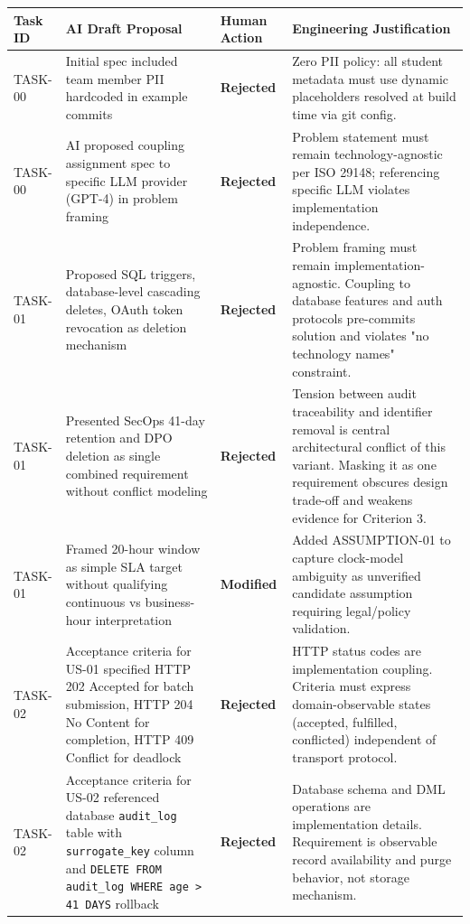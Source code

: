 \documentclass[10pt,a4paper]{article}
\begin{document}
\begin{table}[h]
\centering
\tiny
\begin{tabularx}{\textwidth}{|l|X|l|X|}
\hline
\textbf{Task ID} & \textbf{AI Draft Proposal} & \textbf{Human Action} & \textbf{Engineering Justification} \\
\hline
TASK-00 & Initial spec included team member PII hardcoded in example commits & \textbf{Rejected} & Zero PII policy: all student metadata must use dynamic placeholders resolved at build time via git config. \\
\hline
TASK-00 & AI proposed coupling assignment spec to specific LLM provider (GPT-4) in problem framing & \textbf{Rejected} & Problem statement must remain technology-agnostic per ISO 29148; referencing specific LLM violates implementation independence. \\
\hline
TASK-01 & Proposed SQL triggers, database-level cascading deletes, OAuth token revocation as deletion mechanism & \textbf{Rejected} & Problem framing must remain implementation-agnostic. Coupling to database features and auth protocols pre-commits solution and violates "no technology names" constraint. \\
\hline
TASK-01 & Presented SecOps 41-day retention and DPO deletion as single combined requirement without conflict modeling & \textbf{Rejected} & Tension between audit traceability and identifier removal is central architectural conflict of this variant. Masking it as one requirement obscures design trade-off and weakens evidence for Criterion 3. \\
\hline
TASK-01 & Framed 20-hour window as simple SLA target without qualifying continuous vs business-hour interpretation & \textbf{Modified} & Added ASSUMPTION-01 to capture clock-model ambiguity as unverified candidate assumption requiring legal/policy validation. \\
\hline
TASK-02 & Acceptance criteria for US-01 specified HTTP 202 Accepted for batch submission, HTTP 204 No Content for completion, HTTP 409 Conflict for deadlock & \textbf{Rejected} & HTTP status codes are implementation coupling. Criteria must express domain-observable states (accepted, fulfilled, conflicted) independent of transport protocol. \\
\hline
TASK-02 & Acceptance criteria for US-02 referenced database \texttt{audit\_log} table with \texttt{surrogate\_key} column and \texttt{DELETE FROM audit\_log WHERE age > 41 DAYS} rollback & \textbf{Rejected} & Database schema and DML operations are implementation details. Requirement is observable record availability and purge behavior, not storage mechanism. \\

\end{tabularx}
\end{table}
\end{document}
